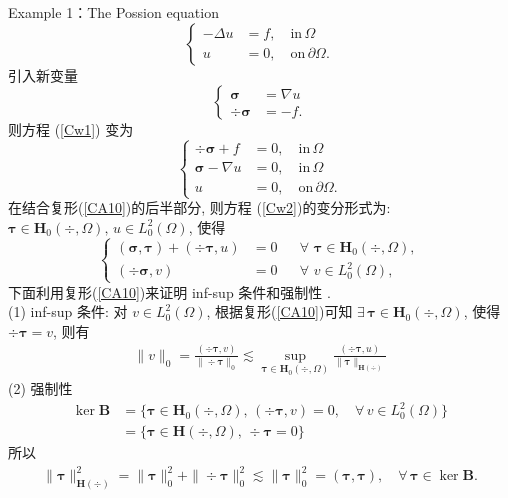 Example 1：The Possion equation
\begin{equation}\label{Cw1}
\left\{
\begin{aligned}
-\Delta u &=f,\quad \mathrm{in}\,\Omega \\
 u &=0, \quad \mathrm{on}\,\partial\Omega .
\end{aligned}\right.
\end{equation}
引入新变量
\begin{equation}\label{Cq}
\left\{
\begin{aligned}
\boldsymbol{\sigma} &=\nabla u \\
\div\boldsymbol{\sigma} &=-f.
\end{aligned}\right.
\end{equation}
则方程 (\ref{Cw1})
变为
\begin{equation}\label{Cw2}
\left\{
\begin{aligned}
\div\boldsymbol{\sigma}+f &=0,\quad \mathrm{in}\,\Omega\\
\boldsymbol{\sigma} -\nabla u&=0,\quad \mathrm{in}\,\Omega\\
 u &=0, \quad \mathrm{on}\,\partial\Omega.
\end{aligned}\right.
\end{equation}
在结合复形(\ref{CA10})的后半部分, 则方程 (\ref{Cw2})的变分形式为: $\boldsymbol{\tau}\in\boldsymbol{H}_0(\div, \Omega),\,u\in L_0^{2}(\Omega)$, 使得
\begin{equation}\label{Cp1}
\left\{
\begin{aligned}
(\boldsymbol{\sigma},\boldsymbol{\tau})+(\div\boldsymbol{\tau},u)&=0
  &&\forall \,\, \boldsymbol{\tau}\in \boldsymbol{H}_0(\div, \Omega),
 \\
 ( \div\boldsymbol{\sigma},v) &=0 &&\forall \,\, v\in L_0^{2}(\Omega),
\end{aligned}\right.
\end{equation}
下面利用复形(\ref{CA10})来证明 inf-sup 条件和强制性 .\\
(1) inf-sup 条件: 对 $v\in L_0^{2}(\Omega)$, 根据复形(\ref{CA10})可知 $ \exists\,\boldsymbol{\tau}\in \boldsymbol{H}_0(\div, \Omega)$,
使得
$\div\boldsymbol{\tau}=v$, 则有
\begin{align*}
\|v\|_{ 0} =\frac{(\div\boldsymbol{\tau},v)}{\|\div\boldsymbol{\tau}\|_{0}}
\lesssim\sup_{\boldsymbol{\tau}\in\boldsymbol{H}_0(\div, \Omega)}\frac{(\div\boldsymbol{\tau},u)}{\|\boldsymbol{\tau}\|_{\boldsymbol{H}(\div)}}
\end{align*}
(2) 强制性
\begin{align*}
\ker \boldsymbol{B}
&=\{\boldsymbol{\tau}\in \boldsymbol{H}_0(\div, \Omega),\,(\div\boldsymbol{\tau},v)=0,\quad\forall \, v\in L_0^{2}(\Omega)\}\\
&=\{\boldsymbol{\tau}\in \boldsymbol{H}(\div, \Omega),\,\div\boldsymbol{\tau}=0\}
\end{align*}
所以
\begin{align*}
\|\boldsymbol{\tau}\|_{\boldsymbol{H}(\div)}^2=\|\boldsymbol{\tau}\|_{0}^2+\|\div\boldsymbol{\tau}\|_{0}^2
\lesssim\|\boldsymbol{\tau}\|_{0}^2=(\boldsymbol{\tau},\boldsymbol{\tau}),\quad\forall \,\boldsymbol{\tau}\in \ker \boldsymbol{B}.
\end{align*}

